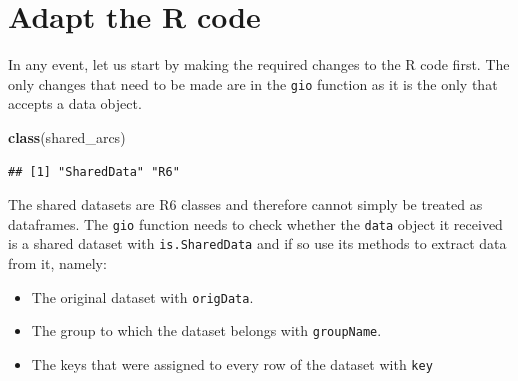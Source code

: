 \documentclass[
]{krantz}
\makeatletter
\newenvironment{Shaded}{\begin{snugshade}}{\end{snugshade}}
\newcommand{\CommentTok}[1]{\textcolor[rgb]{0.37,0.37,0.37}{\textit{#1}}}
\newcommand{\DataTypeTok}[1]{\textcolor[rgb]{0.27,0.27,0.27}{#1}}
\newcommand{\KeywordTok}[1]{\textcolor[rgb]{0.27,0.27,0.27}{\textbf{#1}}}
\newcommand{\NormalTok}[1]{#1}
\newcommand{\OperatorTok}[1]{\textcolor[rgb]{0.43,0.43,0.43}{\textbf{#1}}}
\newcommand{\StringTok}[1]{\textcolor[rgb]{0.5,0.5,0.5}{#1}}
\providecommand{\tightlist}{%
  \setlength{\itemsep}{0pt}\setlength{\parskip}{0pt}}
\newenvironment{kframe}{%
\medskip{}
\setlength{\fboxsep}{.8em}
 \def\at@end@of@kframe{}%
 \ifinner\ifhmode%
  \def\at@end@of@kframe{\end{minipage}}%
  \begin{minipage}{\columnwidth}%
 \fi\fi%
 \def\FrameCommand##1{\hskip\@totalleftmargin \hskip-\fboxsep
 \colorbox{shadecolor}{##1}\hskip-\fboxsep
     \hskip-\linewidth \hskip-\@totalleftmargin \hskip\columnwidth}%
 \MakeFramed {\advance\hsize-\width
   \@totalleftmargin\z@ \linewidth\hsize
   \@setminipage}}%
 {\par\unskip\endMakeFramed%
 \at@end@of@kframe}
\renewenvironment{Shaded}{\begin{kframe}}{\end{kframe}}
\makeatother
\begin{document}
\begin{Shaded}
\end{Shaded}

\hypertarget{adapt-the-r-code}{%
\section{Adapt the R code}\label{adapt-the-r-code}}

In any event, let us start by making the required changes to the R code first. The only changes that need to be made are in the \texttt{gio} function as it is the only that accepts a data object.

\begin{Shaded}
\begin{Highlighting}[]
\KeywordTok{class}\NormalTok{(shared\_arcs)}
\end{Highlighting}
\end{Shaded}

\begin{verbatim}
## [1] "SharedData" "R6"
\end{verbatim}

The shared datasets are R6 classes and therefore cannot simply be treated as dataframes. The \texttt{gio} function needs to check whether the \texttt{data} object it received is a shared dataset with \texttt{is.SharedData} and if so use its methods to extract data from it, namely:

\begin{itemize}
\tightlist
\item
  The original dataset with \texttt{origData}.
\item
  The group to which the dataset belongs with \texttt{groupName}.
\item
  The keys that were assigned to every row of the dataset with \texttt{key}
\end{itemize}

\begin{Shaded}
\end{Shaded}
\end{document}
